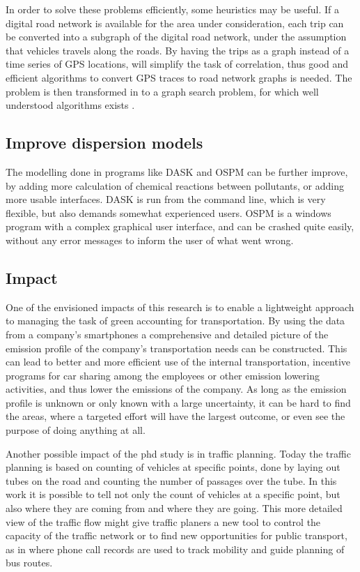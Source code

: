 In order to solve these problems efficiently, some heuristics may be useful. If a digital road network is available for the area under consideration, each trip can be converted into a subgraph of the  digital road network, under the assumption that vehicles travels along the roads. By having the trips as a graph instead of a time series of GPS locations, will simplify the task of correlation, thus good and efficient algorithms to convert GPS traces to road network graphs is needed. The problem is then transformed in to a graph search problem, for which well understood algorithms exists \cite{newman2003structure}.

\subsection{Improve dispersion models}
The modelling done in programs like DASK and OSPM can be  further improve, by adding more calculation of chemical reactions between pollutants, or adding more usable interfaces. DASK is run from the command line, which is very flexible, but also demands somewhat experienced users. OSPM is a windows program with a complex graphical user interface, and can be crashed quite easily, without any error messages to inform the user of what went wrong.

\subsection{Impact}
One of the envisioned impacts of this research is to enable a lightweight approach to managing the task of green accounting for transportation. By using the data from a company's smartphones a comprehensive and detailed picture of the emission profile of the company's transportation needs can be constructed. This can lead to better and more efficient use of the internal transportation, incentive programs for car sharing among the employees or other emission lowering activities, and thus lower the emissions of the company. As long as the emission profile is unknown or only known with a large uncertainty, it can be hard to find the areas, where a targeted effort will have the largest outcome, or even see the purpose of doing anything at all.

Another possible impact of the phd study is in traffic planning. Today the traffic planning is based on counting of vehicles at specific points, done by laying out tubes on the road and counting the number of passages over the tube. In this work it is possible to tell not only the count of vehicles at a specific point, but also where they are coming from and where they are going. This more detailed view of the traffic flow might give traffic planers a new tool to control the capacity of the traffic network or to find new opportunities for public transport, as in \cite{Berlingerio2013} where phone call records are used to track mobility and guide planning of bus routes.

